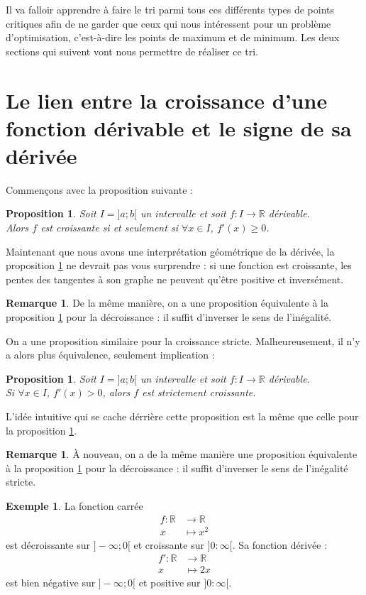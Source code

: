 \documentclass[a4paper,fontsize=13pt]{scrreprt}
\theoremstyle{plain}
\newtheorem{pro}[subsection]{Proposition}
\theoremstyle{definition}
\newtheorem{exe}[subsection]{Exemple}
\newtheorem{rema}[subsection]{Remarque}
\newcommand{\rr}{\mathbb{R}}
\begin{document}
Il va falloir apprendre à faire le tri parmi tous ces différents types de points critiques afin de ne garder que ceux qui nous intéressent pour un problème d'optimisation, c'est-à-dire les points de maximum et de minimum. Les deux sections qui suivent vont nous permettre de réaliser ce tri.
\section{Le lien entre la croissance d'une fonction dérivable et le signe de sa dérivée}
Commençons avec la proposition suivante :
\begin{pro} \label{dercroi}
Soit $I=]a;b[$ un intervalle et soit $f : I \to \rr$ dérivable.\\
Alors $f$ est croissante si et seulement si $\forall x \in I$, $f'(x) \ge 0$.
\end{pro}
Maintenant que nous avons une interprétation géométrique de la dérivée, la proposition \ref{dercroi} ne devrait pas vous surprendre : si une fonction est croissante, les pentes des tangentes à son graphe ne peuvent qu'être positive et inversément. \\
\begin{rema}
De la même manière, on a une proposition équivalente à la proposition \ref{dercroi} pour la décroissance : il suffit d'inverser le sens de l'inégalité.
\end{rema}
On a une proposition similaire pour la croissance stricte. Malheureusement, il n'y a alors plus équivalence, seulement implication :
\begin{pro} \label{dercroistrict}
Soit $I=]a;b[$ un intervalle et soit $f : I \to \rr$ dérivable.\\
Si $\forall x \in I$, $f'(x) > 0$, alors $f$ est strictement croissante.
\end{pro}
L'idée intuitive qui se cache dérrière cette proposition est la même que celle pour la proposition \ref{dercroi}.
\begin{rema}
À nouveau, on a de la même manière une proposition équivalente à la proposition \ref{dercroi} pour la décroissance : il suffit d'inverser le sens de l'inégalité stricte.
\end{rema}
\begin{exe}
La fonction carrée
\begin{align*}
f : \rr &\to \rr \\
x &\mapsto x^2
\end{align*}
est décroissante sur $]-\infty;0[$ et croissante sur $]0:\infty[$. Sa fonction dérivée :
\begin{align*}
f' : \rr &\to \rr \\
x &\mapsto 2x
\end{align*}
est bien négative sur $]-\infty;0[$ et positive sur $]0:\infty[$.
\end{exe}
\end{document}
